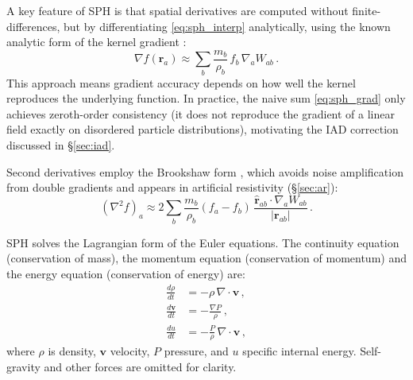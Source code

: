 
A key feature of SPH is that spatial derivatives are computed without finite-differences, but by differentiating \eqref{eq:sph_interp} analytically, using the known analytic form of the kernel gradient \cite{Rosswog2009}:
\begin{equation}
    \nabla f(\mathbf{r}_a) \approx \sum_b \frac{m_b}{\rho_b} \, f_b \, \nabla_a W_{ab}\,.
    \label{eq:sph_grad}
\end{equation}
This approach means gradient accuracy depends on how well the kernel reproduces the underlying function. In practice, the naive sum \eqref{eq:sph_grad} only achieves zeroth-order consistency (it does not reproduce the gradient of a linear field exactly on disordered particle distributions), motivating the IAD correction discussed in \S\ref{sec:iad}.

Second derivatives employ the Brookshaw form \cite{Brookshaw1985}, which avoids noise amplification from double gradients and appears in artificial resistivity (\S\ref{sec:ar}):
\begin{equation}
    (\nabla^2 f)_a \approx 2 \sum_b \frac{m_b}{\rho_b} (f_a - f_b) \, \frac{\hat{\mathbf{r}}_{ab} \cdot \nabla_a W_{ab}}{|\mathbf{r}_{ab}|}\,.
    \label{eq:brookshaw}
\end{equation}


SPH solves the Lagrangian form of the Euler equations. The continuity equation (conservation of mass), the momentum equation (conservation of momentum) and the energy equation (conservation of energy) are: 
\begin{align}
    \frac{d\rho}{dt}   &= -\rho \, \nabla \cdot \mathbf{v}\,, \label{eq:euler_cont} \\
    \frac{d\mathbf{v}}{dt} &= -\frac{\nabla P}{\rho}\,, \label{eq:euler_mom} \\
    \frac{du}{dt}       &= -\frac{P}{\rho} \, \nabla \cdot \mathbf{v}\,, \label{eq:euler_energy}
\end{align}
where $\rho$ is density, $\mathbf{v}$ velocity, $P$ pressure, and $u$ specific internal energy. Self-gravity and other forces are omitted for clarity.


